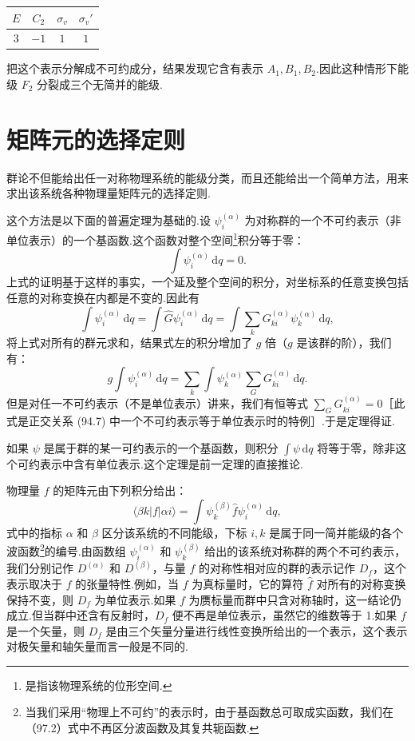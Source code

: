 \begin{center}
\begin{tabular}{cccc}
  $E$ & $C_2$ & $\sigma_v$ & $\sigma_v'$\\
  \hline
  $3$ & $-1$ & $1$ & $1$\\
\end{tabular}
\end{center}

\noindent 把这个表示分解成不可约成分，结果发现它含有表示 $A_1,B_1,B_2$.因此这种情形下能级 $F_2$ 分裂成三个无简并的能级.

\section{矩阵元的选择定则}

群论不但能给出任一对称物理系统的能级分类，而且还能给出一个简单方法，用来求出该系统各种物理量矩阵元的选择定则.

这个方法是以下面的普遍定理为基础的.设 $\psi_i^{(\alpha)}$ 为对称群的一个不可约表示（非单位表示）的一个基函数.这个函数对整个空间\footnote{是指该物理系统的位形空间.}积分等于零：
\begin{equation}
  \int\psi_i^{(\alpha)}\,\mathrm{d}q=0.
\end{equation}
上式的证明基于这样的事实，一个延及整个空间的积分，对坐标系的任意变换包括任意的对称变换在内都是不变的.因此有
\begin{equation*}
  \int\psi_i^{(\alpha)}\,\mathrm{d}q
  =\int\hat{G}\psi_i^{(\alpha)}\,\mathrm{d}q
  =\int\sum_k G_{ki}^{(\alpha)}\psi_k^{(\alpha)}\,\mathrm{d}q,
\end{equation*}
将上式对所有的群元求和，结果式左的积分增加了 $g$ 倍（$g$ 是该群的阶），我们有：
\begin{equation*}
  g\int\psi_i^{(\alpha)}\,\mathrm{d}q
  =\sum_k\int\psi_k^{(\alpha)}\sum_G G_{ki}^{(\alpha)}\,\mathrm{d}q.
\end{equation*}
但是对任一不可约表示（不是单位表示）讲来，我们有恒等式 $\sum_G G_{ki}^{(\alpha)}=0$［此式是正交关系 (94.7) 中一个不可约表示等于单位表示时的特例］.于是定理得证.

如果 $\psi$ 是属于群的某一可约表示的一个基函数，则积分 $\int\psi\,\mathrm{d}q$ 将等于零，除非这个可约表示中含有单位表示.这个定理是前一定理的直接推论.

物理量 $f$ 的矩阵元由下列积分给出：
\begin{equation}
  \langle\beta k|f|\alpha i\rangle
  =\int\psi_k^{(\beta)}\hat{f}\psi_i^{(\alpha)}\,\mathrm{d}q,
\end{equation}
式中的指标 $\alpha$ 和 $\beta$ 区分该系统的不同能级，下标 $i,k$ 是属于同一简并能级的各个波函数\footnote{当我们采用“物理上不可约”的表示时，由于基函数总可取成实函数，我们在（97.2）式中不再区分波函数及其复共轭函数.}的编号.由函数组 $\psi_i^{(\alpha)}$ 和 $\psi_k^{(\beta)}$ 给出的该系统对称群的两个不可约表示，我们分别记作 $D^{(\alpha)}$ 和 $D^{(\beta)}$，与量 $f$ 的对称性相对应的群的表示记作 $D_f$，这个表示取决于 $f$ 的张量特性.例如，当 $f$ 为真标量时，它的算符 $\hat{f}$ 对所有的对称变换保持不变，则 $D_f$ 为单位表示.如果 $f$ 为赝标量而群中只含对称轴时，这一结论仍成立.但当群中还含有反射时，$D_f$ 便不再是单位表示，虽然它的维数等于 1.如果 $f$ 是一个矢量，则 $D_f$ 是由三个矢量分量进行线性变换所给出的一个表示，这个表示对极矢量和轴矢量而言一般是不同的.

